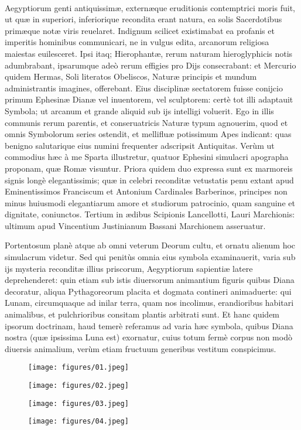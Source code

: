 \documentclass[a4paper, 11pt, oneside, polutonikogreek, latin]{article}
\begin{document}
\paragraph{}
Aegyptiorum genti antiquissimæ, externæque eruditionis contemptrici moris fuit, ut quæ in superiori, inferiorique recondita erant natura, ea solis Sacerdotibus primæque notæ viris reuelaret. Indignum scilicet existimabat ea profanis et imperitis hominibus communicari, ne in vulgus edita, arcanorum religiosa maiestas euilesceret. Ipsi itaq; Hierophantæ, rerum naturam hieroglyphicis notis adumbrabant, ipsarumque adeò rerum effigies pro Dijs consecrabant: et Mercurio quidem Hermas, Soli literatos Obeliscos, Naturæ principis et mundum administrantis imagines, offerebant. Eius disciplinæ sectatorem fuisse conijcio primum Ephesinæ Dianæ vel inuentorem, vel sculptorem: certè tot illi adaptauit Symbola; ut arcanum et grande aliquid sub ijs intelligi voluerit. Ego in illis communis rerum parentis, et conseruatricis Naturæ typum agnouerim, quod et omnis Symbolorum series ostendit, et mellifluæ potissimum Apes indicant: quas benigno salutarique eius numini frequenter adscripsit Antiquitas. Verùm ut commodius hæc à me Sparta illustretur, quatuor Ephesini simulacri apographa proponam, quæ Romæ visuntur. Priora quidem duo expressa sunt ex marmoreis signis longè elegantissimis; quæ in celebri reconditæ vetustatis penu extant apud Eminentissimos Franciscum et Antonium Cardinales Barberinos, principes non minus huiusmodi elegantiarum amore et studiorum patrocinio, quam sanguine et dignitate, coniunctos. Tertium in ædibus Scipionis Lancellotti, Lauri Marchionis: ultimum apud Vincentium Justinianum Bassani Marchionem asseruatur.

Portentosum planè atque ab omni veterum Deorum cultu, et ornatu alienum hoc simulacrum videtur. Sed qui penitùs omnia eius symbola examinauerit, varia sub ijs mysteria reconditæ illius priscorum, Aegyptiorum sapientiæ latere deprehenderet: quin etiam sub istis diuersorum animantium figuris quibus Diana decoratur, aliqua Pythagoreorum placita et dogmata contineri animaduerte: qui Lunam, circumquaque ad inilar terra, quam nos incolimus, erandioribus habitari animalibus, et pulchrioribus consitam plantis arbitrati sunt. Et hanc quidem ipsorum doctrinam, haud temerè referamus ad varia hæc symbola, quibus Diana nostra (quæ ipsissima Luna est) exornatur, cuius totum fermè corpus non modò diuersis animalium, verùm etiam fructuum generibus vestitum conspicimus.
\clearpage
\begin{figure}[H]
\centering
\texttt{[image: figures/01.jpeg]}
\end{figure}
\begin{figure}[H]
\centering
\texttt{[image: figures/02.jpeg]}
\end{figure}
\clearpage
\begin{figure}[H]
\centering
\texttt{[image: figures/03.jpeg]}
\end{figure}
\begin{figure}[H]
\centering
\texttt{[image: figures/04.jpeg]}
\end{figure}
\clearpage
\end{document}
